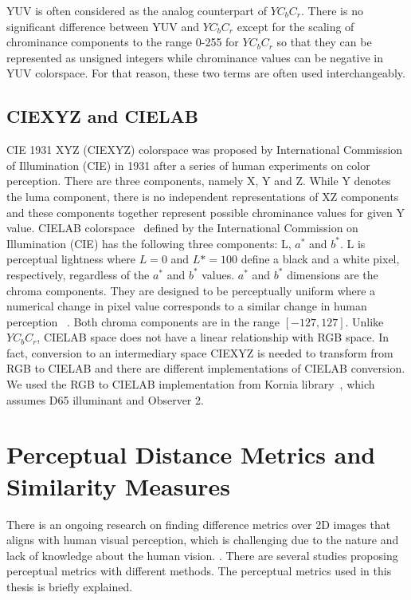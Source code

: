 YUV is often considered as the analog counterpart of \(YC_{b}C_{r}\). There is no significant difference between YUV and \(YC_{b}C_{r}\) except for the scaling of chrominance components to the range 0-255 for \(YC_{b}C_{r}\) so that they can be represented as unsigned integers while chrominance values can be negative in YUV colorspace. For that reason, these two terms are often used interchangeably.

\subsection{CIEXYZ and CIELAB}
CIE 1931 XYZ (CIEXYZ) colorspace was proposed by International Commission of Illumination (CIE) in 1931 after a series of human experiments on color perception. There are three components, namely X, Y and Z. While Y denotes the luma component, there is no independent representations of XZ components and these components together represent possible chrominance values for given Y value.
CIELAB colorspace~\cite{schanda2007colorimetry} defined by the International Commission on Illumination (CIE) has the following three components: L, \(a^*\) and \(b^*\). L is perceptual lightness where \(L = 0\) and \(L* = 100\) define a black and a white pixel, respectively, regardless of the \(a^*\) and \(b^*\) values. \(a^*\) and \(b^*\) dimensions are the chroma components. They are designed to be perceptually uniform where a numerical change in pixel value corresponds to a similar change in human perception ~\cite{mahy1992luminancevschroma}. Both chroma components are in the range \([-127, 127]\). Unlike \(YC_{b}C_{r}\), CIELAB space does not have a linear relationship with RGB space. In fact, conversion to an intermediary space CIEXYZ is needed to transform from RGB to CIELAB and there are different implementations of CIELAB conversion. We used the RGB to CIELAB implementation from Kornia library~\cite{riba2020kornia}, which assumes D65 illuminant and Observer 2.

\section{Perceptual Distance Metrics and Similarity Measures}
There is an ongoing research on finding difference metrics over 2D images that aligns with human visual perception, which is challenging due to the nature and lack of knowledge about the human vision. \cite{ding2021comparison}. There are several studies proposing perceptual metrics with different methods. The perceptual metrics used in this thesis is briefly explained.

